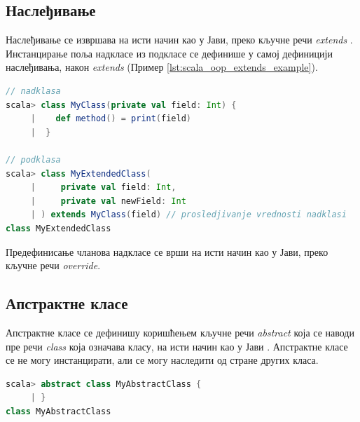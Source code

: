 \documentclass[12pt,oneside]{memoir}
\begin{document}
\subsection{Наслеђивање}
\label{subsec:scala_nasled}

Наслеђивање се извршава на исти начин као у Јави, преко кључне речи \textit{extends} \cite{scala_prog}. Инстанцирање поља надкласе из подкласе се дефинише у самој дефиницији наслеђивања, након \textit{extends} (Пример \ref{lst:scala_oop_extends_example}).

\begin{lstlisting}[language=Scala, caption={Наслеђивање у Скали}, label={lst:scala_oop_extends_example}]
// nadklasa
scala> class MyClass(private val field: Int) {
     |    def method() = print(field)
     |  }

// podklasa
scala> class MyExtendedClass(
     |     private val field: Int,
     |     private val newField: Int
     | ) extends MyClass(field) // prosledjivanje vrednosti nadklasi
class MyExtendedClass

\end{lstlisting}


Предефинисање чланова надкласе се врши на исти начин као у Јави, преко кључне речи \textit{override}.

\subsection{Апстрактне класе}
\label{subsec:scala_abs}

Апстрактне класе се дефинишу коришћењем кључне речи \textit{abstract} која се наводи пре речи \textit{class} која означава класу, на исти начин као у Јави \cite{scala_prog}. Апстрактне класе се не могу инстанцирати, али се могу наследити од стране других класа.

\begin{lstlisting}[language=Scala, caption={Апстрактна класа у Скали}, label={lst:scala_oop_abstract_class_example}]
scala> abstract class MyAbstractClass {
     | }
class MyAbstractClass
\end{lstlisting}

%
\end{document}
